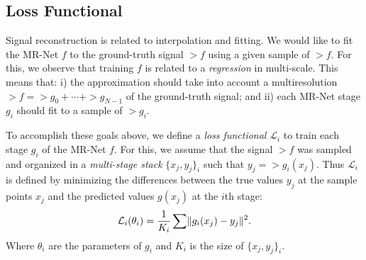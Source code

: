 
\subsection{Loss Functional}

Signal reconstruction is related to interpolation and fitting. We would like to fit the MR-Net $f$ to the ground-truth signal $\gt{f}$ using a given sample of $\gt{f}$.
For this, we observe that training $f$ is related to a \textit{regression} in multi-scale. This means that: i) the approximation should take into account a multiresolution $\gt{f}=\gt{g}_0+\cdots+\gt{g}_{N-1}$ of the ground-truth signal; and ii) each MR-Net stage $g_i$ should fit to a sample of $\gt{g}_i$.

To accomplish these goals above, we define a \emph{loss functional} $\mathcal{L}_i$ to train each stage $g_i$ of the MR-Net $f$. For this, we assume that the signal $\gt{f}$ was sampled and organized in a \textit{multi-stage stack} $\{x_j, y_j\}_i$ such that $y_j=\gt{g}_i(x_j)$.
 Thus $\mathcal{L}_i$ is defined by minimizing the differences between the true values $y_j$ at the sample points $x_j$ and the predicted values $g(x_j)$ at the $i$th stage: 
\begin{align}\label{e-loss}
    \mathcal{L}_i(\theta_i)=\frac{1}{K_i}\sum \lVert g_i(x_j)-y_j\rVert^2.
\end{align}
Where $\theta_i$ are the parameters of $g_i$ and $K_i$ is the size of $\{x_j, y_j\}_i$.


